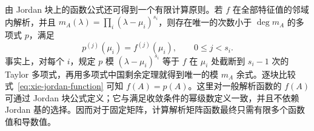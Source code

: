 由 Jordan 块上的函数公式还可得到一个有限计算原则。若 $f$ 在全部特征值的邻域内解析，并且 $m_A(\lambda)=\prod_i(\lambda-\mu_i)^{s_i}$，则存在唯一的次数小于 $\deg m_A$ 的多项式 $p$，满足
\[
    p^{(j)}(\mu_i)=f^{(j)}(\mu_i),\qquad 0\le j<s_i.
\]
事实上，对每个 $i$，规定 $p$ 模 $(\lambda-\mu_i)^{s_i}$ 等于 $f$ 在 $\mu_i$ 处截断到 $s_i-1$ 次的 Taylor 多项式，再用多项式中国剩余定理就得到唯一的模 $m_A$ 余式。逐块比较式~\eqref{eq:xie-jordan-function} 可知 $f(A)=p(A)$。这里对一般解析函数的 $f(A)$ 可通过 Jordan 块公式定义；它与满足收敛条件的幂级数定义一致，并且不依赖 Jordan 基的选择。因而对于固定矩阵，计算解析矩阵函数最终只需有限多个函数值和导数值。






